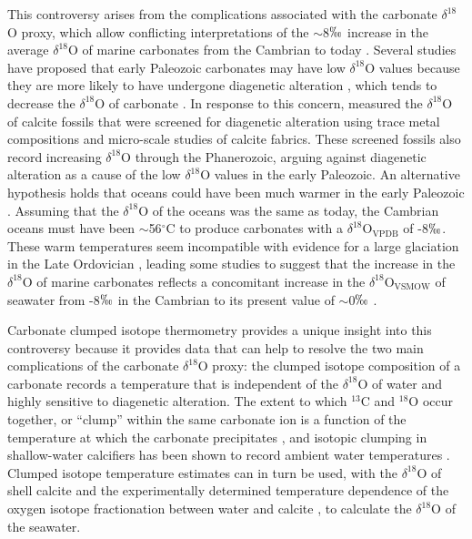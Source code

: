 \documentclass[5p, authoryear]{elsarticle}
\begin{document}
This controversy arises from the complications associated with the carbonate $\delta^{18}$O proxy, which allow conflicting interpretations of the $\sim$8$\permil$ increase in the average $\delta^{18}$O of marine carbonates from the Cambrian to today \citep{Jaffres2007, Veizer1999}. Several studies have proposed that early Paleozoic carbonates may have low $\delta^{18}$O values because they are more likely to have undergone diagenetic alteration \citep{Clayton1959, Keith1964, Land1995}, which tends to decrease the $\delta^{18}$O of carbonate \citep{Marshall1992}. In response to this concern, \cite{Veizer1999} measured the $\delta^{18}$O of calcite fossils that were screened for diagenetic alteration using trace metal compositions and micro-scale studies of calcite fabrics. These screened fossils also record increasing $\delta^{18}$O through the Phanerozoic, arguing against diagenetic alteration as a cause of the low $\delta^{18}$O values in the early Paleozoic. An alternative hypothesis holds that oceans could have been much warmer in the early Paleozoic \citep{Karhu1986, Knauth1976}. Assuming that the $\delta^{18}$O of the oceans was the same as today, the Cambrian oceans must have been $\sim$56$^{\circ}$C to produce carbonates with a $\delta^{18}$O$_{\text{VPDB}}$ of -8$\permil$. These warm temperatures seem incompatible with evidence for a large glaciation in the Late Ordovician \citep{Veizer1986}, leading some studies to suggest that the increase in the $\delta^{18}$O of marine carbonates reflects a concomitant increase in the $\delta^{18}$O$_{\text{VSMOW}}$ of seawater from -8$\permil$ in the Cambrian to its present value of $\sim$0$\permil$ \citep{Jaffres2007, Veizer1999}. 

Carbonate clumped isotope thermometry provides a unique insight into this controversy because it provides data that can help to resolve the two main complications of the carbonate $\delta^{18}$O proxy: the clumped isotope composition of a carbonate records a temperature that is independent of the $\delta^{18}$O of water and highly sensitive to diagenetic alteration. The extent to which $^{13}$C and $^{18}$O occur together, or ``clump'' within the same carbonate ion is a function of the temperature at which the carbonate precipitates \citep{Eiler2011}, and isotopic clumping in shallow-water calcifiers has been shown to record ambient water temperatures \citep{Ghosh2006, Henkes2013, Saenger2012, Tripati2010}. Clumped isotope temperature estimates can in turn be used, with the $\delta^{18}$O of shell calcite and the experimentally determined temperature dependence of the oxygen isotope fractionation between water and calcite \citep{Kim1997}, to calculate the $\delta^{18}$O of the seawater. 
\end{document}

